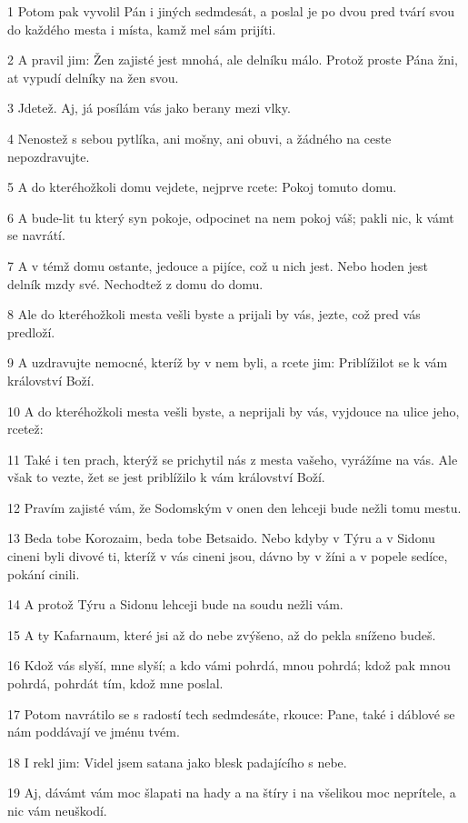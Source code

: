 \par 1 Potom pak vyvolil Pán i jiných sedmdesát, a poslal je po dvou pred tvárí svou do každého mesta i místa, kamž mel sám prijíti.
\par 2 A pravil jim: Žen zajisté jest mnohá, ale delníku málo. Protož proste Pána žni, at vypudí delníky na žen svou.
\par 3 Jdetež. Aj, já posílám vás jako berany mezi vlky.
\par 4 Nenostež s sebou pytlíka, ani mošny, ani obuvi, a žádného na ceste nepozdravujte.
\par 5 A do kteréhožkoli domu vejdete, nejprve rcete: Pokoj tomuto domu.
\par 6 A bude-lit tu který syn pokoje, odpocinet na nem pokoj váš; pakli nic, k vámt se navrátí.
\par 7 A v témž domu ostante, jedouce a pijíce, což u nich jest. Nebo hoden jest delník mzdy své. Nechodtež z domu do domu.
\par 8 Ale do kteréhožkoli mesta vešli byste a prijali by vás, jezte, což pred vás predloží.
\par 9 A uzdravujte nemocné, kteríž by v nem byli, a rcete jim: Priblížilot se k vám království Boží.
\par 10 A do kteréhožkoli mesta vešli byste, a neprijali by vás, vyjdouce na ulice jeho, rcetež:
\par 11 Také i ten prach, kterýž se prichytil nás z mesta vašeho, vyrážíme na vás. Ale však to vezte, žet se jest priblížilo k vám království Boží.
\par 12 Pravím zajisté vám, že Sodomským v onen den lehceji bude nežli tomu mestu.
\par 13 Beda tobe Korozaim, beda tobe Betsaido. Nebo kdyby v Týru a v Sidonu cineni byli divové ti, kteríž v vás cineni jsou, dávno by v žíni a v popele sedíce, pokání cinili.
\par 14 A protož Týru a Sidonu lehceji bude na soudu nežli vám.
\par 15 A ty Kafarnaum, které jsi až do nebe zvýšeno, až do pekla sníženo budeš.
\par 16 Kdož vás slyší, mne slyší; a kdo vámi pohrdá, mnou pohrdá; kdož pak mnou pohrdá, pohrdát tím, kdož mne poslal.
\par 17 Potom navrátilo se s radostí tech sedmdesáte, rkouce: Pane, také i dáblové se nám poddávají ve jménu tvém.
\par 18 I rekl jim: Videl jsem satana jako blesk padajícího s nebe.
\par 19 Aj, dávámt vám moc šlapati na hady a na štíry i na všelikou moc neprítele, a nic vám neuškodí.
